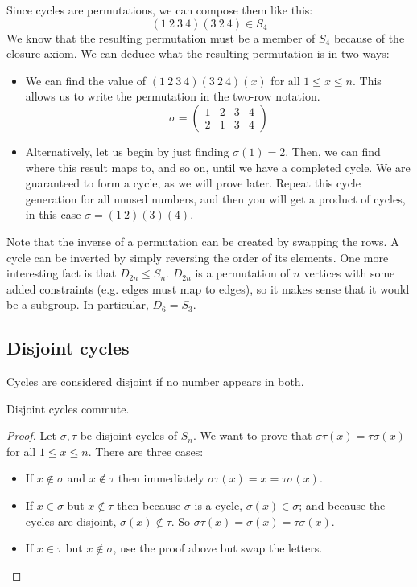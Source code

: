 Since cycles are permutations, we can compose them like this:
\[
	(1\ 2\ 3\ 4)(3\ 2\ 4) \in S_4
\]
We know that the resulting permutation must be a member of \(S_4\) because of the closure axiom.
We can deduce what the resulting permutation is in two ways:
\begin{itemize}
	\item We can find the value of \((1\ 2\ 3\ 4)(3\ 2\ 4)(x)\) for all \(1 \leq x \leq n\).
	      This allows us to write the permutation in the two-row notation.
	      \[
		      \sigma = \begin{pmatrix}
			      1 & 2 & 3 & 4 \\
			      2 & 1 & 3 & 4
		      \end{pmatrix}
	      \]
	\item Alternatively, let us begin by just finding \(\sigma(1) = 2\).
	      Then, we can find where this result maps to, and so on, until we have a completed cycle.
	      We are guaranteed to form a cycle, as we will prove later.
	      Repeat this cycle generation for all unused numbers, and then you will get a product of cycles, in this case \(\sigma = (1\ 2)(3)(4)\).
\end{itemize}
Note that the inverse of a permutation can be created by swapping the rows.
A cycle can be inverted by simply reversing the order of its elements.
One more interesting fact is that \(D_{2n} \leq S_n\).
\(D_{2n}\) is a permutation of \(n\) vertices with some added constraints (e.g.
edges must map to edges), so it makes sense that it would be a subgroup.
In particular, \(D_6 = S_3\).

\subsection{Disjoint cycles}
Cycles are considered disjoint if no number appears in both.
\begin{lemma}
	Disjoint cycles commute.
\end{lemma}
\begin{proof}
	Let \(\sigma, \tau\) be disjoint cycles of \(S_n\).
	We want to prove that \(\sigma\tau(x) = \tau\sigma(x)\) for all \(1 \leq x \leq n\).
	There are three cases:
	\begin{itemize}
		\item If \(x \notin \sigma\) and \(x \notin \tau\) then immediately \(\sigma\tau(x) = x = \tau\sigma(x)\).
		\item If \(x \in \sigma\) but \(x \notin \tau\) then because \(\sigma\) is a cycle, \(\sigma(x) \in \sigma\); and because the cycles are disjoint, \(\sigma(x) \notin \tau\).
		      So \(\sigma\tau(x) = \sigma(x) = \tau\sigma(x)\).
		\item If \(x \in \tau\) but \(x \notin \sigma\), use the proof above but swap the letters.
	\end{itemize}
\end{proof}

